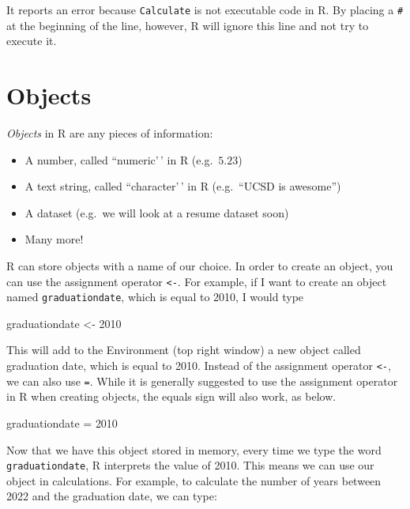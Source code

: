\documentclass[
]{book}
\newenvironment{Shaded}{\begin{snugshade}}{\end{snugshade}}
\newcommand{\DecValTok}[1]{\textcolor[rgb]{0.00,0.00,0.81}{#1}}
\newcommand{\NormalTok}[1]{#1}
\newcommand{\OtherTok}[1]{\textcolor[rgb]{0.56,0.35,0.01}{#1}}
\providecommand{\tightlist}{%
  \setlength{\itemsep}{0pt}\setlength{\parskip}{0pt}}
\begin{document}
It reports an error because \texttt{Calculate} is not executable code in R. By placing a \texttt{\#} at the beginning of the line, however, R will ignore this line and not try to execute it.

\section{Objects}\label{objects}

\emph{Objects} in R are any pieces of information:

\begin{itemize}
\tightlist
\item
  A number, called ``numeric'\,' in R (e.g.~\(5.23\))
\item
  A text string, called ``character'\,' in R (e.g.~``UCSD is awesome'')
\item
  A dataset (e.g.~we will look at a resume dataset soon)
\item
  Many more!
\end{itemize}

R can store objects with a name of our choice. In order to create an object, you can use the assignment operator \texttt{\textless{}-}. For example, if I want to create an object named \texttt{graduationdate}, which is equal to 2010, I would type

\begin{Shaded}
\begin{Highlighting}[]
\NormalTok{graduationdate }\OtherTok{\textless{}{-}} \DecValTok{2010}
\end{Highlighting}
\end{Shaded}

This will add to the Environment (top right window) a new object called graduation date, which is equal to 2010. Instead of the assignment operator \texttt{\textless{}-}, we can also use \texttt{=}. While it is generally suggested to use the assignment operator in R when creating objects, the equals sign will also work, as below.

\begin{Shaded}
\begin{Highlighting}[]
\NormalTok{graduationdate }\OtherTok{=} \DecValTok{2010}
\end{Highlighting}
\end{Shaded}

Now that we have this object stored in memory, every time we type the word \texttt{graduationdate}, R interprets the value of 2010. This means we can use our object in calculations. For example, to calculate the number of years between 2022 and the graduation date, we can type:
\end{document}
